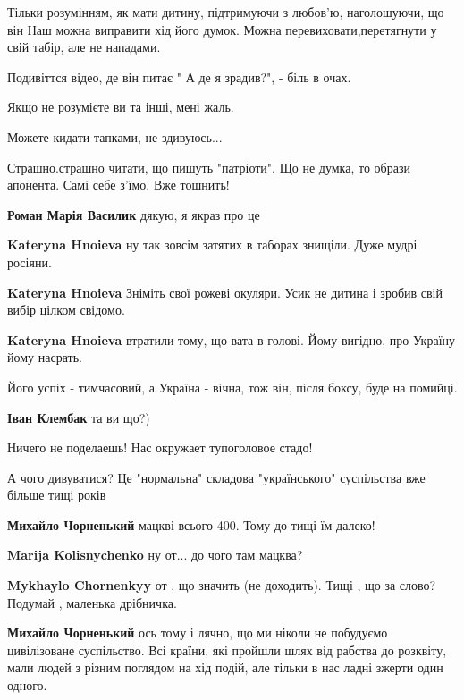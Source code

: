 \begin{itemize}
\begin{itemize}
Тільки розумінням, як мати дитину, підтримуючи з любов'ю, наголошуючи, що він
Наш можна виправити хід його думок. Можна перевиховати,перетягнути у свій
табір, але не нападами.

Подивіттся відео, де він питає " А де я зрадив?", - біль в очах.

Якщо не розумієте ви та інші, мені жаль.

Можете кидати тапками, не здивуюсь...

Страшно.страшно читати, що пишуть "патріоти". Що не думка, то образи апонента.
Самі себе з'їмо. Вже тошнить!

\textbf{Роман Марія Василик} дякую, я якраз про це

\textbf{Kateryna Hnoieva} ну так зовсім затятих в таборах знищіли. Дуже мудрі росіяни.

\textbf{Kateryna Hnoieva} Зніміть свої рожеві окуляри. Усик не дитина і зробив свій вибір цілком свідомо.

\textbf{Kateryna Hnoieva} втратили тому, що вата в голові. Йому вигідно, про Україну йому насрать.

\end{itemize} %

Його успіх - тимчасовий, а Україна - вічна, тож він, після боксу, буде на
помийці.

\begin{itemize} %
\textbf{Іван Клембак} та ви що?)
\end{itemize} %

Ничего не поделаешь! Нас окружает тупоголовое стадо!

А чого дивуватися? Це "нормальна" складова "українського" суспільства вже більше тищі років

\begin{itemize} %
\textbf{Михайло Чорненький} мацкві всього 400. Тому до тищі їм далеко!

\textbf{Marija Kolisnychenko} ну от... до чого там мацква?

\textbf{Mykhaylo Chornenkyy} от , що значить (не доходить). Тищі , що за слово? Подумай , маленька дрібничка.

\textbf{Михайло Чорненький} ось тому і лячно, що ми ніколи не побудуємо цивілізоване суспільство. Всі країни, які пройшли шлях від рабства до розквіту, мали людей з різним поглядом на хід подій, але тільки в нас ладні зжерти один одного.


\end{itemize}
\end{itemize}
